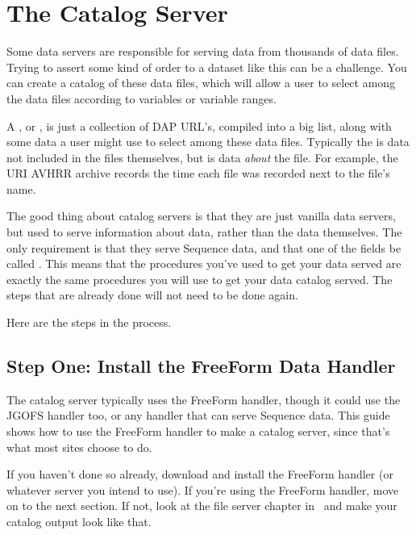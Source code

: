 
\chapter{The Catalog Server}
\label{dods-server,catalog}

 Some data servers are
responsible for serving data from thousands of data files. Trying to
assert some kind of order to a dataset like this can be a challenge.
You can create a catalog of these data files, which will allow a user
to select among the data files according to variables or variable
ranges.

 A
, or , is just a collection of
DAP URL's, compiled into a big list, along with some data a user might
use to select among these data files. Typically the  is data not included in the files themselves, but is data
\emph{about} the file. For example, the URI AVHRR archive records the
time each file was recorded next to the file's name.

The good thing about catalog servers is that they are just vanilla
data servers, but used to serve information about data, rather than
the data themselves. The only requirement is that they serve Sequence
data, and that one of the fields be called . This means
that the procedures you've used to get your data served are exactly
the same procedures you will use to get your data catalog served. The
steps that are already done will not need to be done again.

Here are the steps in the process.

\section{Step One: Install the FreeForm Data Handler}

The catalog server typically uses the FreeForm handler, though it
could use the JGOFS handler too, or any handler that can serve
Sequence data. This guide shows how to use the FreeForm handler to
make a catalog server, since that's what most sites choose to do.

 If
you haven't done so already, download and install the FreeForm handler
(or whatever server you intend to use). If you're using the FreeForm
handler, move on to the next section. If not, look at the file server
chapter in \DODSquick\ and make your catalog output look like that.

